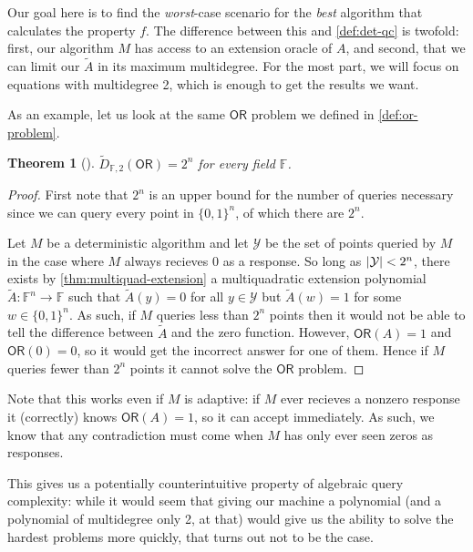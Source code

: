 \documentclass[english]{reedthesis}
\theoremstyle{plain}
\newtheorem{thm}{Theorem}[section]
\theoremstyle{definition}
\theoremstyle{remark}
\DeclarePairedDelimiter{\abs}{\lvert}{\rvert}
\begin{document}
Our goal here is to find the \emph{worst}-case scenario for the \emph{best}
algorithm that calculates the property $f$. The difference between this and
\cref{def:det-qc} is twofold: first, our algorithm $M$ has access to
an extension oracle of $A$, and second, that we can limit our $\tilde{A}$ in
its maximum multidegree. For the most part, we will focus on equations with
multidegree 2, which is enough to get the results we want.

As an example, let us look at the same $\mathsf{OR}$ problem we defined in
\cref{def:or-problem}.

\begin{thm}[{\cite[Thm.\ 4.4]{AW09}}]\label{thm:or-algebraic}
  $\tilde{D}_{\mathbb{F},2}(\mathsf{OR}) = 2^{n}$ for every field $\mathbb{F}$.
\end{thm}

\begin{proof}
  First note that $2^{n}$ is an upper bound for the number of queries necessary
  since we can query every point in $\{0, 1\}^{n}$, of which there are $2^{n}$.

  Let $M$ be a deterministic algorithm and let $\mathcal{Y}$ be the set of points queried
  by $M$ in the case where $M$ always recieves $0$ as a response. So long as
  $\abs{\mathcal{Y}} < 2^{n}$, there exists by \cref{thm:multiquad-extension} a
  multiquadratic extension polynomial $\tilde{A}: \mathbb{F}^{n} \rightarrow \mathbb{F}$
  such that $\tilde{A}(y) = 0$ for all $y \in \mathcal{Y}$ but $\tilde{A}(w) = 1$ for some
  $w \in \{0, 1\}^{n}$. As such, if $M$ queries less than $2^{n}$ points then it
  would not be able to tell the difference between $\tilde{A}$ and the zero
  function. However, $\mathsf{OR}(A) = 1$ and $\mathsf{OR}(0) = 0$, so it would
  get the incorrect answer for one of them. Hence if $M$ queries fewer than
  $2^{n}$ points it cannot solve the $\mathsf{OR}$ problem.
\end{proof}

Note that this works even if $M$ is adaptive: if $M$ ever recieves a nonzero
response it (correctly) knows $\mathsf{OR}(A) = 1$, so it can accept
immediately. As such, we know that any contradiction must come when $M$ has only
ever seen zeros as responses.

This gives us a potentially counterintuitive property of algebraic query
complexity: while it would seem that giving our machine a polynomial (and a
polynomial of multidegree only 2, at that) would give us the ability to solve
the hardest problems more quickly, that turns out not to be the case.
\end{document}

